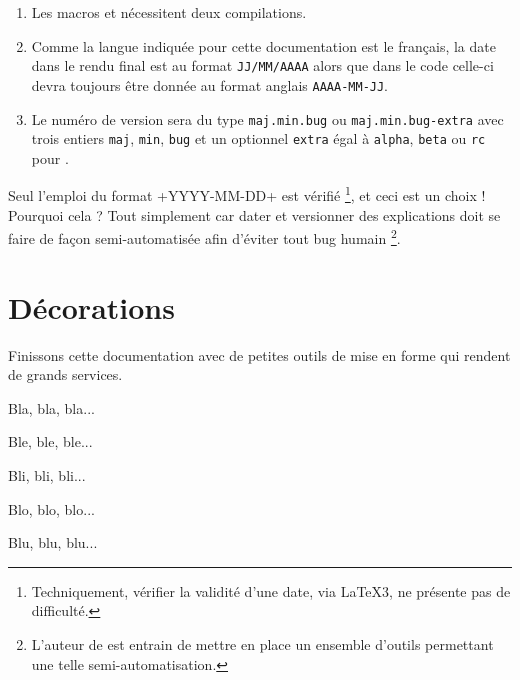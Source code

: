 \documentclass[10pt, a4paper]{article}
\begin{document}
\begin{bdocimportant}
    \leavevmode

    \begin{enumerate}
        \item Les macros  et  nécessitent deux compilations.

        \item Comme la langue indiquée pour cette documentation est le français, la date dans le rendu final est au format \texttt{JJ/MM/AAAA} alors que dans le code celle-ci devra toujours être donnée au format anglais \texttt{AAAA-MM-JJ}.

        \item Le numéro de version sera du type \texttt{maj.min.bug} ou \texttt{maj.min.bug-extra} avec trois entiers \texttt{maj}, \texttt{min}, \texttt{bug} et un optionnel \texttt{extra} égal à \texttt{alpha}, \texttt{beta} ou \texttt{rc} pour .
    \end{enumerate}
\end{bdocimportant}


\begin{bdocwarn}
    Seul l'emploi du format \bdocinlatex+YYYY-MM-DD+ est vérifié
    \footnote{
        Techniquement, vérifier la validité d'une date, via \LaTeX3, ne présente pas de difficulté.
    },
    et ceci est un choix ! Pourquoi cela ? Tout simplement car dater et versionner des explications doit se faire de façon semi-automatisée afin d'éviter tout bug humain
    \footnote{
        L'auteur de  est entrain de mettre en place un ensemble d'outils permettant une telle semi-automatisation.
    }.
\end{bdocwarn}


\section{Décorations}

Finissons cette documentation avec de petites outils de mise en forme qui rendent de grands services.

\begin{bdoclatex}[sbs]
Bla, bla, bla...

\bdocsep %

Ble, ble, ble...

Bli, bli, bli...

\bdocxspace %

Blo, blo, blo...

Blu, blu, blu...

\end{bdoclatex}
\end{document}
